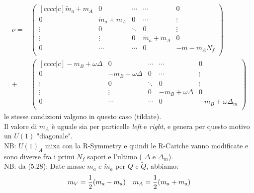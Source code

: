 \documentclass[a4paper,12pt]{article}
\begin{document}
\begin{align*}
\nu = &
\begin{pmatrix}[c c c c|c]
		\tilde m_a + m_A 	& 0 		& \cdots 	& \cdots 	& 0 \\
		0 			 & \tilde m_a + m_A 	& 0 &\cdots & \vdots \\
		\vdots 		& 0 		& \ddots & 0 & \vdots \\
		\vdots & \vdots & 0 & \tilde m_a + m_A 	 & 0 \\
		\hline 
		0 & \cdots & \cdots & 0 & -m  - m_A N_f\\
\end{pmatrix} \\
+ & 
\begin{pmatrix}[c c c c|c]
		- m_B + \omega \Delta 	& 0 		& \cdots 	& \cdots 	& 0 \\
		0 			 & - m_B + \omega \Delta  & 0 &\cdots & \vdots \\
		\vdots 		& 0 		& \ddots & 0 & \vdots \\
		\vdots & \vdots & 0 & - m_B + \omega \Delta & 0 \\
		\hline 
		0 & \cdots & \cdots & 0 & -m_B + \omega \Delta_m\\
\end{pmatrix}
\end{align*}
le stesse condizioni valgono in questo caso (tildate).\\
Il valore di $m_A$ è uguale sia per particelle \emph{left} e \emph{right}, e genera per questo motivo un $U(1)$ "diagonale".\\
NB: $U(1)_A$ mixa con la R-Symmetry e quindi le R-Cariche vanno modificate e sono diverse fra i primi $N_f$ sapori e l'ultimo ( $\Delta $ e $\Delta_m$).\\

NB: da \citep{Aharony:2013dha} (5.28):
Date masse $m_a$ e $\tilde m_a$ per $Q$ e $\tilde{Q}$, abbiamo:
$$
	m_V = {1 \over 2 }( m_a -  m_a) \quad m_A = {1 \over 2 }( m_a + m_a)
$$
\end{document}
